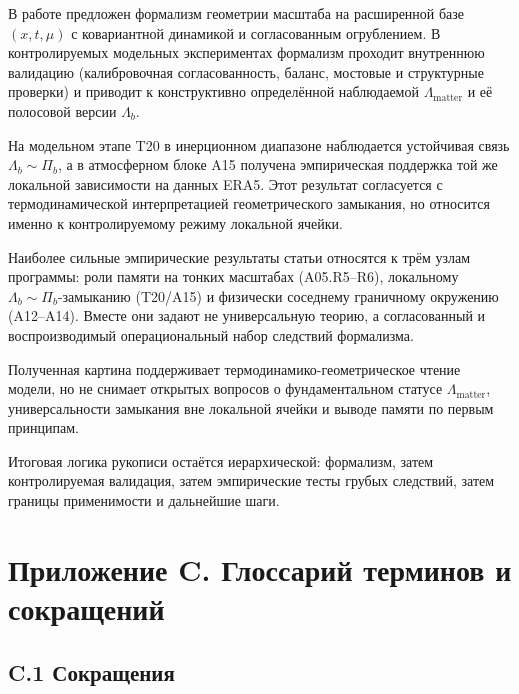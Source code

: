\documentclass[11pt,a4paper]{article}
\theoremstyle{definition}
\theoremstyle{plain}
\theoremstyle{remark}
\begin{document}
В работе предложен формализм геометрии масштаба на расширенной базе $(x,t,\mu)$ с ковариантной динамикой и согласованным огрублением.
В контролируемых модельных экспериментах формализм проходит внутреннюю валидацию (калибровочная согласованность, баланс, мостовые и структурные проверки) и приводит к конструктивно определённой наблюдаемой $\Lambda_{\mathrm{matter}}$ и её полосовой версии $\Lambda_b$.

На модельном этапе T20 в инерционном диапазоне наблюдается устойчивая связь \(\Lambda_b\sim\Pi_b\), а в атмосферном блоке A15 получена эмпирическая поддержка той же локальной зависимости на данных ERA5. Этот результат согласуется с термодинамической интерпретацией геометрического замыкания, но относится именно к контролируемому режиму локальной ячейки.

Наиболее сильные эмпирические результаты статьи относятся к трём узлам программы: роли памяти на тонких масштабах (A05.R5--R6), локальному $\Lambda_b\sim\Pi_b$-замыканию (T20/A15) и физически соседнему граничному окружению (A12--A14). Вместе они задают не универсальную теорию, а согласованный и воспроизводимый операциональный набор следствий формализма.

Полученная картина поддерживает термодинамико-геометрическое чтение модели, но не снимает открытых вопросов о фундаментальном статусе $\Lambda_{\mathrm{matter}}$, универсальности замыкания вне локальной ячейки и выводе памяти по первым принципам.

Итоговая логика рукописи остаётся иерархической:
формализм, затем контролируемая валидация, затем эмпирические тесты грубых следствий, затем границы применимости и дальнейшие шаги.

\appendix
\newpage

\section*{Приложение C. Глоссарий терминов и сокращений}
\label{sec:appendix:glossary}

\subsection*{C.1 Сокращения}
\end{document}
